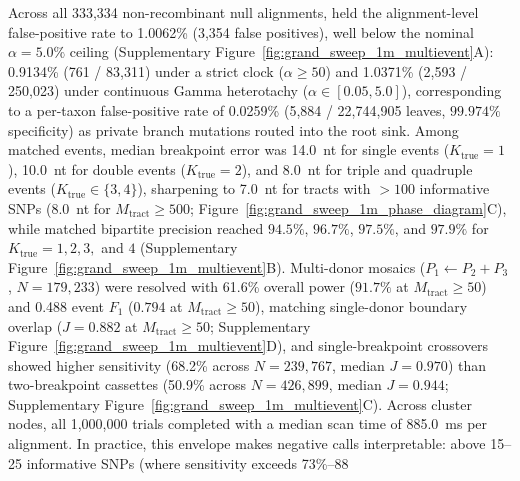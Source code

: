 Across all 333,334 non-recombinant null alignments, \RhizAeon held the alignment-level false-positive rate to 1.0062\% (3,354 false positives), well below the nominal $\alpha = 5.0\%$ ceiling (Supplementary Figure~\ref{fig:grand_sweep_1m_multievent}A): 0.9134\% (761 / 83,311) under a strict clock ($\alpha \ge 50$) and 1.0371\% (2,593 / 250,023) under continuous Gamma heterotachy ($\alpha \in [0.05, 5.0]$), corresponding to a per-taxon false-positive rate of 0.0259\% (5,884 / 22,744,905 leaves, $99.974\%$ specificity) as private branch mutations routed into the root sink. Among matched events, median breakpoint error was 14.0~nt for single events ($K_{\mathrm{true}}=1$), 10.0~nt for double events ($K_{\mathrm{true}}=2$), and 8.0~nt for triple and quadruple events ($K_{\mathrm{true}} \in \{3, 4\}$), sharpening to 7.0~nt for tracts with $>100$ informative SNPs ($8.0$~nt for $M_{\mathrm{tract}} \ge 500$; Figure~\ref{fig:grand_sweep_1m_phase_diagram}C), while matched bipartite precision reached $94.5\%$, $96.7\%$, $97.5\%$, and $97.9\%$ for $K_{\mathrm{true}} = 1, 2, 3,$ and $4$ (Supplementary Figure~\ref{fig:grand_sweep_1m_multievent}B). Multi-donor mosaics ($P_1 \leftarrow P_2 + P_3$, $N = 179{,}233$) were resolved with 61.6\% overall power ($91.7\%$ at $M_{\mathrm{tract}} \ge 50$) and 0.488 event $F_1$ ($0.794$ at $M_{\mathrm{tract}} \ge 50$), matching single-donor boundary overlap ($J = 0.882$ at $M_{\mathrm{tract}} \ge 50$; Supplementary Figure~\ref{fig:grand_sweep_1m_multievent}D), and single-breakpoint crossovers showed higher sensitivity (68.2\% across $N = 239{,}767$, median $J = 0.970$) than two-breakpoint cassettes (50.9\% across $N = 426{,}899$, median $J = 0.944$; Supplementary Figure~\ref{fig:grand_sweep_1m_multievent}C). Across cluster nodes, all 1,000,000 trials completed with a median scan time of 885.0~ms per alignment. In practice, this envelope makes negative calls interpretable: above 15--25 informative SNPs (where sensitivity exceeds 73\%--88%
